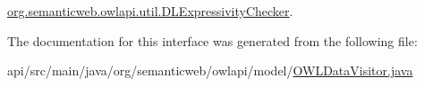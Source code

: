 \hyperlink{classorg_1_1semanticweb_1_1owlapi_1_1util_1_1_d_l_expressivity_checker_abcd65ef5add7e4cf06d118154c0e0cbd}{org.\-semanticweb.\-owlapi.\-util.\-D\-L\-Expressivity\-Checker}.



The documentation for this interface was generated from the following file\-:\begin{DoxyCompactItemize}
\item 
api/src/main/java/org/semanticweb/owlapi/model/\hyperlink{_o_w_l_data_visitor_8java}{O\-W\-L\-Data\-Visitor.\-java}\end{DoxyCompactItemize}

